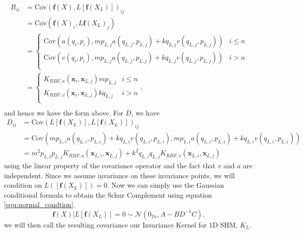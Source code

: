 \documentclass{statsmsc}
\begin{document}
\begin{align*}
B_{ij} &= \mathrm{Cov}(\mathbf{f}(X), L[\mathbf{f}(X_L)])_{ij} \\
       &= \mathrm{Cov}(\mathbf{f}(X)_i, L\mathbf{f}(X_L)_j) \\ 
       &= \begin{cases}
        \mathrm{Cov}(a(q_i, p_i), mp_{L,j}a(q_{L,j},p_{L,j}) + kq_{L,j}v(q_{L,j},p_{L,j})) & i\le n \\ 
        \mathrm{Cov}(v(q_i, p_i), mp_{L,j}a(q_{L,j},p_{L,j}) + kq_{L,j}v(q_{L,j},p_{L,j})) & i>n \\ 
       \end{cases} \\
       &= \begin{cases}
        K_{RBF,a}(\mathbf{x}_i, \mathbf{x}_{L,j}) mp_{L,j} & i\le n \\ 
        K_{RBF,v}(\mathbf{x}_i, \mathbf{x}_{L,j}) kq_{L,j} & i>n \\ 
       \end{cases}, \\
\end{align*}
and hence we have the form above. 
For $D$, we have
\begin{align*}
D_{ij} &= \mathrm{Cov}(L[\mathbf{f}(X_L)], L[\mathbf{f}(X_L)])_{ij} \\
       &= \mathrm{Cov}(mp_{L,i}a(q_{L,i},p_{L,i}) + kq_{L,i}v(q_{L,i},p_{L,i}), mp_{L,i}a(q_{L,i},p_{L,i}) + kq_{L,i}v(q_{L,i},p_{L,i})) \\
       &= m^2p_{L,i}p_{L,j}K_{RBF,a}(\mathbf{x}_{L,i},\mathbf{x}_{L,j}) + k^2q_{L,i}q_{L,j}K_{RBF,v}(\mathbf{x}_{L,i},\mathbf{x}_{L,j})
\end{align*}
using the linear property of the covariance operator and the fact that $v$ and $a$ are independent.
Since we assume invariance on these invariance points, we will condition on $L([\mathbf{f}(X_L)])=0.$
Now we can simply use the Gaussian conditional formula to obtain the Schur Complement using equation \ref{equ:normal_condtion}.
$$
\mathbf{f}(X)|L[\mathbf{f}(X_L)]=0\sim\mathcal{N}(0_{2n},A-BD^{-1}C),
$$
we will then call the resulting covariance our Invariance Kernel for 1D SHM, $K_L$.
\end{document}
